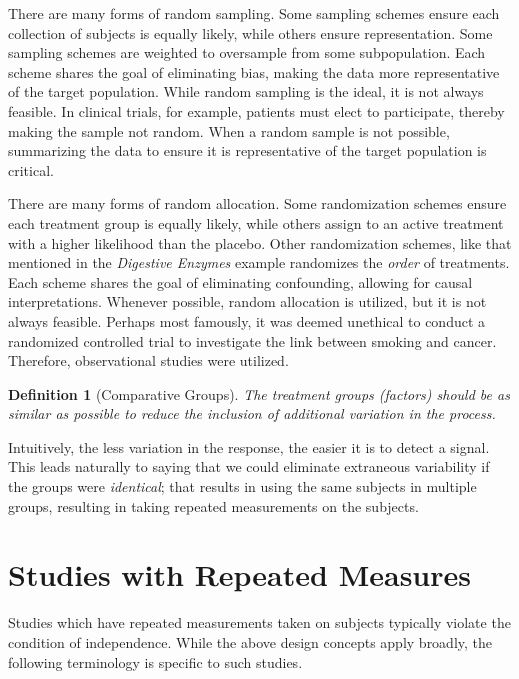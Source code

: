 \documentclass[
]{book}
\theoremstyle{plain}
\theoremstyle{mydefn}
\newtheorem{definition}{Definition}[chapter]
\theoremstyle{myexmpl}
\theoremstyle{remark}
\begin{document}
There are many forms of random sampling. Some sampling schemes ensure each collection of subjects is equally likely, while others ensure representation. Some sampling schemes are weighted to oversample from some subpopulation. Each scheme shares the goal of eliminating bias, making the data more representative of the target population. While random sampling is the ideal, it is not always feasible. In clinical trials, for example, patients must elect to participate, thereby making the sample not random. When a random sample is not possible, summarizing the data to ensure it is representative of the target population is critical.

There are many forms of random allocation. Some randomization schemes ensure each treatment group is equally likely, while others assign to an active treatment with a higher likelihood than the placebo. Other randomization schemes, like that mentioned in the \emph{Digestive Enzymes} example randomizes the \emph{order} of treatments. Each scheme shares the goal of eliminating confounding, allowing for causal interpretations. Whenever possible, random allocation is utilized, but it is not always feasible. Perhaps most famously, it was deemed unethical to conduct a randomized controlled trial to investigate the link between smoking and cancer. Therefore, observational studies were utilized.

\begin{definition}[Comparative Groups]
\protect\hypertarget{def:defn-comparative-groups}{}{\label{def:defn-comparative-groups} {} }The treatment groups (factors) should be as similar as possible to reduce the inclusion of additional variation in the process.
\end{definition}

Intuitively, the less variation in the response, the easier it is to detect a signal. This leads naturally to saying that we could eliminate extraneous variability if the groups were \emph{identical}; that results in using the same subjects in multiple groups, resulting in taking repeated measurements on the subjects.

\hypertarget{studies-with-repeated-measures}{%
\section{Studies with Repeated Measures}\label{studies-with-repeated-measures}}

Studies which have repeated measurements taken on subjects typically violate the condition of independence. While the above design concepts apply broadly, the following terminology is specific to such studies.
\end{document}
